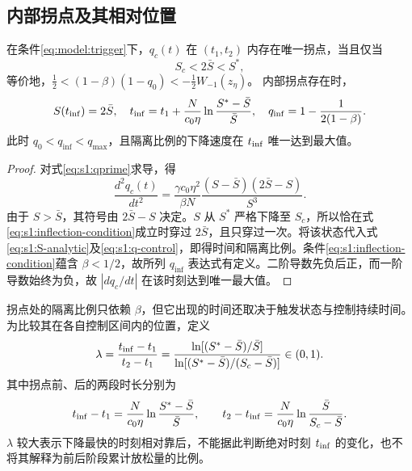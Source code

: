 \documentclass[lang=cn,a4paper,newtx]{elegantpaper}
\numberwithin{equation}{section}
\theoremstyle{plain}
\newcommand{\qinf}{q_{\mathrm{inf}}}
\begin{document}
\subsection{内部拐点及其相对位置}
\begin{theorem}
\label{thm:s1:inflection}
在条件\eqref{eq:model:trigger}下，$q_c(t)$ 在 $(t_1,t_2)$ 内存在唯一拐点，当且仅当
\begin{equation}
S_c<2\bar S<S^*,
\label{eq:s1:inflection-condition}
\end{equation}
等价地，$\frac12<(1-\beta)(1-q_0)<-\frac12W_{-1}(z_\eta)$。
内部拐点存在时，
\begin{equation}
S(t_{\rm inf})=2\bar S,\quad
 t_{\rm inf}=t_1+\frac{N}{c_0\eta}\ln\frac{S^*-\bar S}{\bar S},\quad
\qinf=1-\frac1{2(1-\beta)}.
\label{eq:s1:inflection-values}
\end{equation}
此时 $q_0<\qinf<q_{\max}$，且隔离比例的下降速度在 $t_{\rm inf}$ 唯一达到最大值。
\end{theorem}
\begin{proof}
对式\eqref{eq:s1:qprime}求导，得
\begin{equation}
\frac{d^2q_c(t)}{dt^2}
=\frac{\gamma c_0\eta^2}{\beta N}
\frac{(S-\bar S)(2\bar S-S)}{S^3}.
\label{eq:s1:qsecond}
\end{equation}
由于 $S>\bar S$，其符号由 $2\bar S-S$ 决定。$S$ 从 $S^*$ 严格下降至 $S_c$，所以恰在式\eqref{eq:s1:inflection-condition}成立时穿过 $2\bar S$，且只穿过一次。将该状态代入式\eqref{eq:s1:S-analytic}及\eqref{eq:s1:q-control}，即得时间和隔离比例。条件\eqref{eq:s1:inflection-condition}蕴含 $\beta<1/2$，故所列 $\qinf$ 表达式有定义。二阶导数先负后正，而一阶导数始终为负，故 $|dq_c/dt|$ 在该时刻达到唯一最大值。
\end{proof}

拐点处的隔离比例只依赖 $\beta$，但它出现的时间还取决于触发状态与控制持续时间。为比较其在各自控制区间内的位置，定义
\begin{equation}
\lambda=\frac{t_{\rm inf}-t_1}{t_2-t_1}
=\frac{\ln[(S^*-\bar S)/\bar S]}
{\ln[(S^*-\bar S)/(S_c-\bar S)]}\in(0,1).
\label{eq:s1:lambda}
\end{equation}
其中拐点前、后的两段时长分别为
\begin{equation}
t_{\rm inf}-t_1=\frac{N}{c_0\eta}\ln\frac{S^*-\bar S}{\bar S},\qquad
 t_2-t_{\rm inf}=\frac{N}{c_0\eta}\ln\frac{\bar S}{S_c-\bar S}.
\label{eq:s1:seg-high}
\end{equation}
$\lambda$ 较大表示下降最快的时刻相对靠后，不能据此判断绝对时刻 $t_{\rm inf}$ 的变化，也不将其解释为前后阶段累计放松量的比例。
\end{document}
